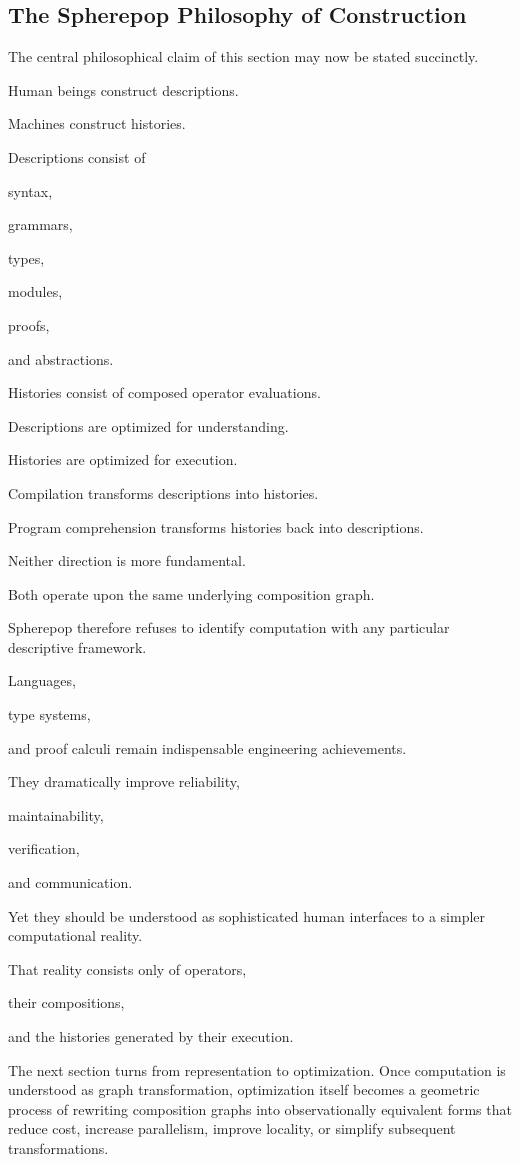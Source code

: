 \documentclass[12pt,oneside]{article}
\begin{document}
\subsection{The Spherepop Philosophy of Construction}

The central philosophical claim of this section may now be stated succinctly.

Human beings construct descriptions.

Machines construct histories.

Descriptions consist of

syntax,

grammars,

types,

modules,

proofs,

and abstractions.

Histories consist of composed operator evaluations.

Descriptions are optimized for understanding.

Histories are optimized for execution.

Compilation transforms descriptions into histories.

Program comprehension transforms histories back into descriptions.

Neither direction is more fundamental.

Both operate upon the same underlying composition graph.

Spherepop therefore refuses to identify computation with any particular descriptive framework.

Languages,

type systems,

and proof calculi remain indispensable engineering achievements.

They dramatically improve reliability,

maintainability,

verification,

and communication.

Yet they should be understood as sophisticated human interfaces to a simpler computational reality.

That reality consists only of operators,

their compositions,

and the histories generated by their execution.

The next section turns from representation to optimization. Once computation is understood as graph transformation, optimization itself becomes a geometric process of rewriting composition graphs into observationally equivalent forms that reduce cost, increase parallelism, improve locality, or simplify subsequent transformations.
\end{document}
